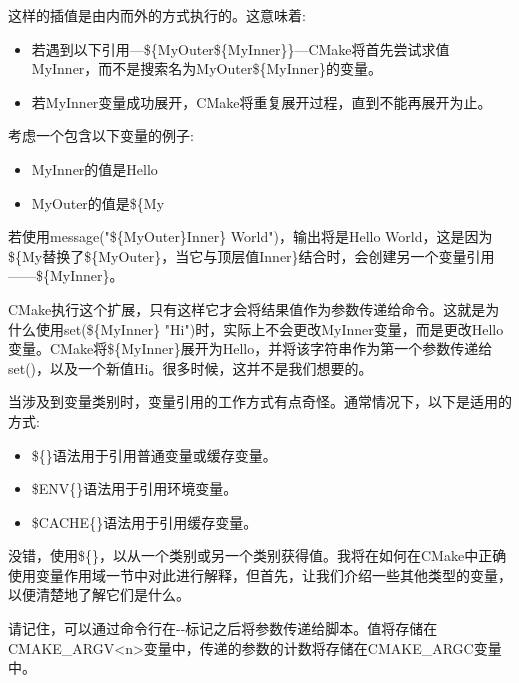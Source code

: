 这样的插值是由内而外的方式执行的。这意味着:

\begin{itemize}
\item 
若遇到以下引用—\$\{MyOuter\$\{MyInner\}\}—CMake将首先尝试求值MyInner，而不是搜索名为MyOuter\$\{MyInner\}的变量。

\item 
若MyInner变量成功展开，CMake将重复展开过程，直到不能再展开为止。
\end{itemize}

考虑一个包含以下变量的例子:

\begin{itemize}
\item 
MyInner的值是Hello

\item 
MyOuter的值是\$\{My
\end{itemize}

若使用message("\$\{MyOuter\}Inner\} World")，输出将是Hello World，这是因为\$\{My替换了\$\{MyOuter\}，当它与顶层值Inner\}结合时，会创建另一个变量引用——\$\{MyInner\}。

CMake执行这个扩展，只有这样它才会将结果值作为参数传递给命令。这就是为什么使用set(\$\{MyInner\} "Hi")时，实际上不会更改MyInner变量，而是更改Hello变量。CMake将\$\{MyInner\}展开为Hello，并将该字符串作为第一个参数传递给set()，以及一个新值Hi。很多时候，这并不是我们想要的。

当涉及到变量类别时，变量引用的工作方式有点奇怪。通常情况下，以下是适用的方式:

\begin{itemize}
\item 
\$\{\}语法用于引用普通变量或缓存变量。

\item 
\$ENV\{\}语法用于引用环境变量。

\item 
\$CACHE\{\}语法用于引用缓存变量。
\end{itemize}

没错，使用\$\{\}，以从一个类别或另一个类别获得值。我将在如何在CMake中正确使用变量作用域一节中对此进行解释，但首先，让我们介绍一些其他类型的变量，以便清楚地了解它们是什么。

\begin{tcolorbox}[colback=blue!5!white,colframe=blue!75!black,title=Note]
请记住，可以通过命令行在-{}-标记之后将参数传递给脚本。值将存储在CMAKE\_ARGV<n>变量中，传递的参数的计数将存储在CMAKE\_ARGC变量中。
\end{tcolorbox}

